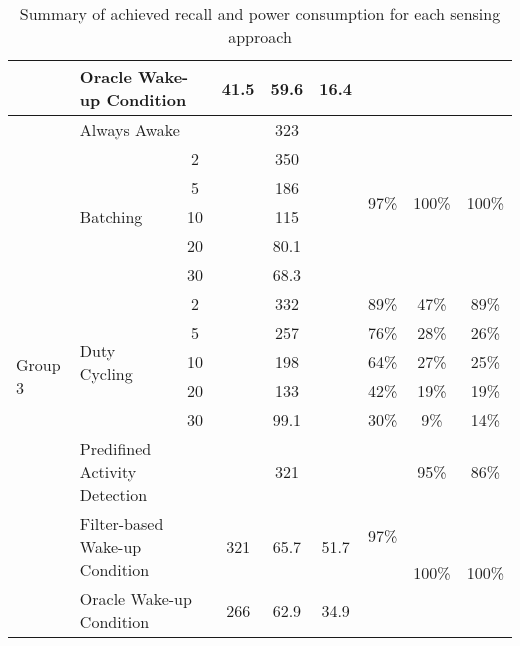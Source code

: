 \begin{table*}[t]
\begin{tabular}{|l|l|c|c|c|c|c|c|c|}
								& \multicolumn{2}{l|}{Oracle Wake-up Condition}			& 41.5		& 59.6		& 16.4			& 						& 							& 							\\ \hline \hline
	\multirow{14}{*}{Group 3}	& \multicolumn{2}{l|}{Always Awake}						& \multicolumn{3}{c|}{323}				& \multirow{6}{*}{97\%}	& \multirow{6}{*}{100\%}	& \multirow{6}{*}{100\%}	\\ \cline{2-6}
								& \multirow{5}{*}{Batching}		& 2						& \multicolumn{3}{c|}{350}				&						&							&							\\ \cline{3-6}
								& 								& 5						& \multicolumn{3}{c|}{186}				&						&							&							\\ \cline{3-6}
								& 								& 10					& \multicolumn{3}{c|}{115}				&						&							&							\\ \cline{3-6}
								& 								& 20					& \multicolumn{3}{c|}{80.1}				&						&							&							\\ \cline{3-6}
								& 								& 30					& \multicolumn{3}{c|}{68.3}				&						&							&							\\ \cline{2-9}
								& \multirow{5}{*}{Duty Cycling}	& 2						& \multicolumn{3}{c|}{332}				& 89\%					& 47\%						& 89\%						\\ \cline{3-9}
								& 								& 5						& \multicolumn{3}{c|}{257}				& 76\%					& 28\%						& 26\%						\\ \cline{3-9}
								& 								& 10					& \multicolumn{3}{c|}{198}				& 64\%					& 27\%						& 25\%						\\ \cline{3-9}
								& 								& 20					& \multicolumn{3}{c|}{133}				& 42\%					& 19\%						& 19\%						\\ \cline{3-9}
								& 								& 30					& \multicolumn{3}{c|}{99.1}				& 30\%					& 9\%						& 14\%						\\ \cline{2-9}
								& \multicolumn{2}{l|}{Predifined Activity Detection}	& \multicolumn{3}{c|}{321}				& \multirow{3}{*}{97\%}	& 95\%						& 86\%						\\ \cline{2-6}\cline{8-9}
								& \multicolumn{2}{l|}{Filter-based Wake-up Condition}	& 321		& 65.7		& 51.7			& 						& \multirow{2}{*}{100\%}	& \multirow{2}{*}{100\%}	\\ \cline{2-6}
								& \multicolumn{2}{l|}{Oracle Wake-up Condition}			& 266		& 62.9		& 34.9			& 						& 							& 							\\ \hline
    \end{tabular}
	\caption{Summary of achieved recall and power consumption for each sensing approach}
	\label{table:summaryRecallPower}
\end{table*}

